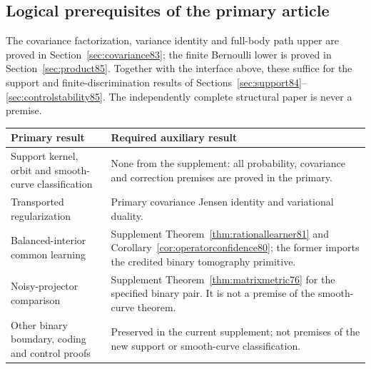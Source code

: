 \subsection{Logical prerequisites of the primary article}
The covariance factorization, variance identity and full-body path
upper are proved in Section~\ref{sec:covariance83}; the finite
Bernoulli lower is proved in Section~\ref{sec:product85}.  Together
with the interface above, these suffice for the support and
finite-discrimination results of
Sections~\ref{sec:support84}--\ref{sec:controlstability85}.
The independently complete structural paper is never a premise.
\begin{center}
\begin{tabular}{@{}>{\raggedright\arraybackslash}p{}>{\raggedright\arraybackslash}p{}@{}}
\toprule
Primary result & Required auxiliary result\\
\midrule
Support kernel, orbit and smooth-curve classification &
None from the supplement: all probability, covariance and correction
premises are proved in the primary.\\
Transported regularization &
Primary covariance Jensen identity and variational duality.\\
Balanced-interior common learning &
Supplement Theorem~\ref{thm:rationallearner81} and
Corollary~\ref{cor:operatorconfidence80}; the former imports the
credited binary tomography primitive.\\
Noisy-projector comparison &
Supplement Theorem~\ref{thm:matrixmetric76} for the specified binary
pair. It is not a premise of the smooth-curve theorem.\\
Other binary boundary, coding and control proofs &
Preserved in the current supplement; not premises of the new
support or smooth-curve classification.\\
\bottomrule
\end{tabular}
\end{center}
